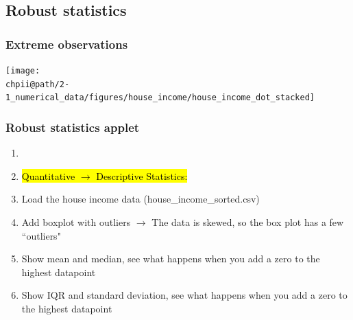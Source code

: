 \documentclass[slidestop,compress,mathserif]{beamer}
\makeatletter
\def\chpii@path{../../Chp 2}
\makeatother
\begin{document}
\subsection{Robust statistics}


\begin{frame}
\frametitle{Extreme observations}


\begin{center}
\texttt{[image: \\chpii@path/2-1\_numerical\_data/figures/house\_income/house\_income\_dot\_stacked]}
\end{center}

\end{frame}


\begin{frame}
\frametitle{Robust statistics applet}
\begin{enumerate}
  \item  {}
  \item \hl{Quantitative $\rightarrow$ Descriptive Statistics:}
  \item Load the house income data (house\_income\_sorted.csv)
  \item Add boxplot with outliers $\rightarrow$ The data is skewed, so the box plot has a few ``outliers"
  \item Show mean and median, see what happens when you add a zero to the highest datapoint
  \item Show IQR and standard deviation, see what happens when you add a zero to the highest datapoint
\end{enumerate}
\end{frame}
\end{document}
